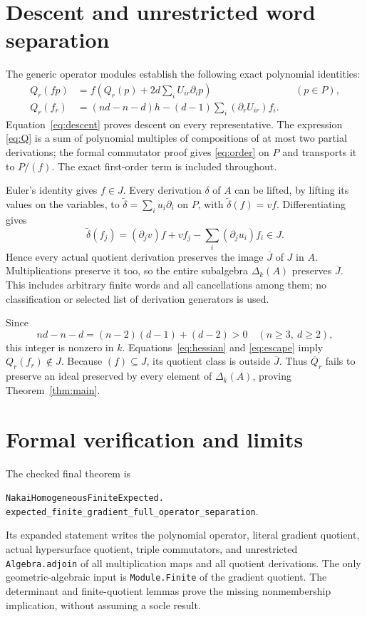 \documentclass[11pt,letterpaper]{article}
\begin{document}
\section{Descent and unrestricted word separation}
The generic operator modules establish the following exact polynomial identities:
\begin{align}
 Q_r(fp)&=f\left(Q_r(p)+2d\sum_iU_{ir}\partial_i p\right)
       &&(p\in P),\label{eq:descent}\\
 Q_r(f_r)&=(nd-n-d)h-(d-1)\sum_i(\partial_rU_{ir})f_i.\label{eq:escape}
\end{align}
Equation~\eqref{eq:descent} proves descent on every representative.
The expression \eqref{eq:Q} is a sum of polynomial multiples of compositions
of at most two partial derivations; the formal commutator proof gives
\eqref{eq:order} on \(P\) and transports it to \(P/(f)\).
The exact first-order term is included throughout.

Euler's identity gives \(f\in J\). Every derivation \(\delta\) of \(A\) can be
lifted, by lifting its values on the variables, to
\(\widetilde\delta=\sum_i u_i\partial_i\) on \(P\), with
\(\widetilde\delta(f)=vf\). Differentiating gives
\[
 \widetilde\delta(f_j)
 =(\partial_jv)f+vf_j-\sum_i(\partial_ju_i)f_i\in J.
\]
Hence every actual quotient derivation preserves the image \(\overline J\)
of \(J\) in \(A\). Multiplications preserve it too, so the entire subalgebra
\(\Delta_k(A)\) preserves \(\overline J\). This includes arbitrary finite
words and all cancellations among them; no classification or selected
list of derivation generators is used.

Since
\[
 nd-n-d=(n-2)(d-1)+(d-2)>0\quad(n\ge3,\ d\ge2),
\]
this integer is nonzero in \(k\). Equations~\eqref{eq:hessian} and
\eqref{eq:escape} imply \(Q_r(f_r)\notin J\).
Because \((f)\subseteq J\), its quotient class is outside \(\overline J\).
Thus \(\overline Q_r\) fails to preserve an ideal preserved by every element
of \(\Delta_k(A)\), proving Theorem~\ref{thm:main}.

\section{Formal verification and limits}
The checked final theorem is
\begin{center}
\texttt{NakaiHomogeneousFiniteExpected.}\\
\texttt{expected\_finite\_gradient\_full\_operator\_separation}.
\end{center}
Its expanded statement writes the polynomial operator, literal gradient
quotient, actual hypersurface quotient, triple commutators, and unrestricted
\texttt{Algebra.adjoin} of all multiplication maps and all quotient derivations.
The only geometric-algebraic input is \texttt{Module.Finite} of the gradient
quotient. The determinant and finite-quotient lemmas prove the missing
nonmembership implication, without assuming a socle result.
\end{document}
